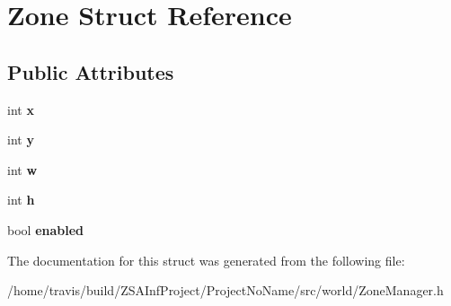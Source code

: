 \hypertarget{structZone}{\section{Zone Struct Reference}
\label{structZone}
}
\subsection*{Public Attributes}
\begin{DoxyCompactItemize}
\item 
\hypertarget{structZone_a439327647492fa561be6d47ab3d40bec}{int {\bfseries x}}\label{structZone_a439327647492fa561be6d47ab3d40bec}

\item 
\hypertarget{structZone_a1a0acf355558e1188d459e66bd6e317d}{int {\bfseries y}}\label{structZone_a1a0acf355558e1188d459e66bd6e317d}

\item 
\hypertarget{structZone_a0cbeccc4a1342d8d3c7ea1bb76fbdc7a}{int {\bfseries w}}\label{structZone_a0cbeccc4a1342d8d3c7ea1bb76fbdc7a}

\item 
\hypertarget{structZone_a73278f3e8442ac43ef17fbe4bf883c9f}{int {\bfseries h}}\label{structZone_a73278f3e8442ac43ef17fbe4bf883c9f}

\item 
\hypertarget{structZone_adc6e5df23ca113dc0a8dc879d2587e1a}{bool {\bfseries enabled}}\label{structZone_adc6e5df23ca113dc0a8dc879d2587e1a}

\end{DoxyCompactItemize}


The documentation for this struct was generated from the following file\-:\begin{DoxyCompactItemize}
\item 
/home/travis/build/\-Z\-S\-A\-Inf\-Project/\-Project\-No\-Name/src/world/Zone\-Manager.\-h\end{DoxyCompactItemize}
